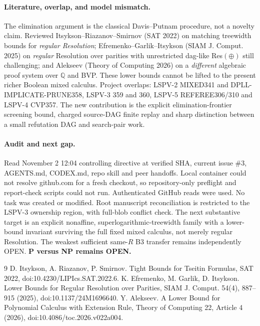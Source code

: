 \documentclass[11pt]{article}
\begin{document}
\paragraph{Literature, overlap, and model mismatch.}
The elimination argument is the classical Davis--Putnam procedure, not a novelty claim. Reviewed Itsykson--Riazanov--Smirnov (SAT 2022) on matching treewidth bounds for \emph{regular Resolution}; Efremenko--Garlik--Itsykson (SIAM J. Comput. 2025) on \emph{regular} Resolution over parities with unrestricted dag-like Res$(\oplus)$ still challenging; and Alekseev (Theory of Computing 2026) on a \emph{different} algebraic proof system over $\mathbb Q$ and BVP. These lower bounds cannot be lifted to the present richer Boolean mixed calculus. Project overlaps: LSPV-2 MIXED341 and DPLL-IMPLICATE-PRUNE358, LSPV-3 359 and 360, LSPV-5 REFEREE306/310 and LSPV-4 CVP357. The new contribution is the explicit elimination-frontier screening bound, charged source-DAG finite replay and sharp distinction between a small refutation DAG and search-pair work.

\paragraph{Audit and next gap.}
Read November 2 12:04 controlling directive at verified SHA, current issue \#3, AGENTS.md, CODEX.md, repo skill and peer handoffs. Local container could not resolve github.com for a fresh checkout, so repository-only preflight and report-check scripts could not run. Authenticated GitHub reads were used. No task was created or modified. Root manuscript reconciliation is restricted to the LSPV-3 ownership region, with full-blob conflict check. The next substantive target is an explicit nonaffine, superlogarithmic-treewidth family with a lower-bound invariant surviving the full fixed mixed calculus, not merely regular Resolution. The weakest sufficient same-$R$ B3 transfer remains independently OPEN. \textbf{P versus NP remains OPEN.}

\begin{thebibliography}{9}
 D. Itsykson, A. Riazanov, P. Smirnov. Tight Bounds for Tseitin Formulas, SAT 2022, doi:10.4230/LIPIcs.SAT.2022.6.
 K. Efremenko, M. Garlik, D. Itsykson. Lower Bounds for Regular Resolution over Parities, SIAM J. Comput. 54(4), 887--915 (2025), doi:10.1137/24M1696640.
 Y. Alekseev. A Lower Bound for Polynomial Calculus with Extension Rule, Theory of Computing 22, Article 4 (2026), doi:10.4086/toc.2026.v022a004.
\end{thebibliography}
\end{document}
